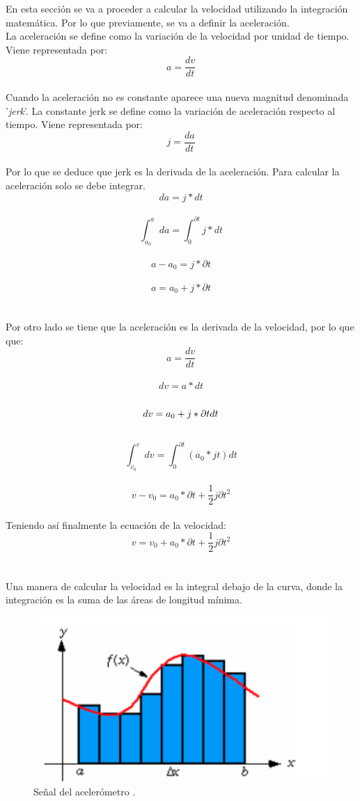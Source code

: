 En esta sección se va a proceder a calcular la velocidad utilizando la integración matemática. Por lo que previamente, se va a definir la aceleración.
\\
La aceleración se define como la variación de la velocidad por unidad de tiempo. Viene representada por:
\\
\[a = \frac{dv}{dt}\]
\\
Cuando la aceleración no es constante aparece una nueva magnitud denominada '\textit{jerk}'. La constante jerk se define como la variación de aceleración respecto al tiempo. Viene representada por:
\\
\[j = \frac{da}{dt}\]
\\
Por lo que se deduce que jerk es la derivada de la aceleración. Para calcular la aceleración solo se debe integrar.
\\
\[da=j*dt\]
\\
\[\int_{a_{0}}^{a}da=\int_{0}^{\partial t}j*dt\]
\\
\[a - a_{0} = j *\partial t\]
\\
\[a = a_{0} + j *\partial t\]
\\
\\
Por otro lado se tiene que la aceleración es la derivada de la velocidad, por lo que que:
\\
\[a = \frac{dv}{dt}\]
\\
\[dv=a*dt\]
\\
\[dv=a_{0} + j *\partial t\*dt\]
\\
\[\int_{v_{0}}^{v}dv=\int_{0}^{\partial t}(a_{0}*jt)dt\]
\\
\[v-v_{0}=a_{0}*\partial t+\frac{1}{2} j \partial t^{2}\]
\\
Teniendo así finalmente la ecuación de la velocidad:
\\
\textbf{
\[v=v_{0}+a_{0}*\partial t+\frac{1}{2} j \partial t^{2}\]}
\\
\\
Una manera de calcular la velocidad es la integral debajo de la curva, donde la integración es la suma de las áreas de longitud mínima.

\begin{figure}[h]
	\centering
	\includegraphics[scale=0.7]{imagenes/velocidad.png}
	\caption{Señal del acelerómetro \cite{nxp}.}
	\label{Calculo velocidad}
\end{figure}

